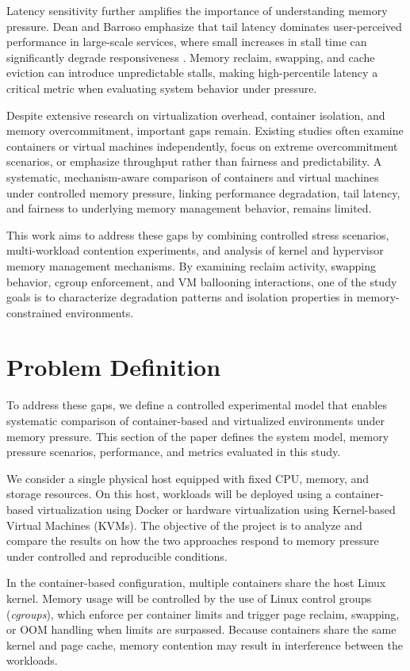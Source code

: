 \documentclass[conference]{IEEEtran}
\begin{document}
Latency sensitivity further amplifies the importance of understanding memory pressure. Dean and Barroso emphasize that tail latency dominates user-perceived performance in large-scale services, where small increases in stall time can significantly degrade responsiveness \cite{dean2013tail}. Memory reclaim, swapping, and cache eviction can introduce unpredictable stalls, making high-percentile latency a critical metric when evaluating system behavior under pressure.

Despite extensive research on virtualization overhead, container isolation, and memory overcommitment, important gaps remain. Existing studies often examine containers or virtual machines independently, focus on extreme overcommitment scenarios, or emphasize throughput rather than fairness and predictability. A systematic, mechanism-aware comparison of containers and virtual machines under controlled memory pressure, linking performance degradation, tail latency, and fairness to underlying memory management behavior, remains limited.

This work aims to address these gaps by combining controlled stress scenarios, multi-workload contention experiments, and analysis of kernel and hypervisor memory management mechanisms. By examining reclaim activity, swapping behavior, cgroup enforcement, and VM ballooning interactions, one of the study goals is to characterize degradation patterns and isolation properties in memory-constrained environments.

\section{Problem Definition}
To address these gaps, we define a controlled experimental model that enables systematic comparison of container-based and virtualized environments under memory pressure. This section of the paper defines the system model, memory pressure scenarios, performance, and metrics evaluated in this study.

We consider a single physical host equipped with fixed CPU, memory, and storage resources. On this host, workloads will be deployed using a container-based virtualization using Docker or hardware virtualization using Kernel-based Virtual Machines (KVMs). The objective of the project is to analyze and compare the results on how the two approaches respond to memory pressure under controlled and reproducible conditions.

In the container-based configuration, multiple containers share the host Linux kernel. Memory usage will be controlled by the use of Linux control groups (\textit{cgroups}), which enforce per container limits and trigger page reclaim, swapping, or OOM handling when limits are surpassed. Because containers share the same kernel and page cache, memory contention may result in interference between the workloads. 
\end{document}
